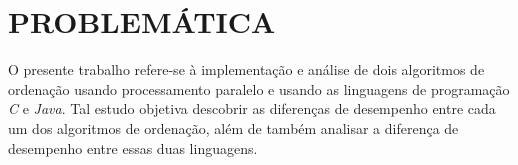 \section{\normalsize PROBLEMÁTICA}
	O presente trabalho refere-se à implementação e análise de dois algoritmos de ordenação usando processamento paralelo e usando as linguagens de programação \textit{C} e \textit{Java}. Tal estudo objetiva  descobrir as diferenças de desempenho entre cada um dos algoritmos de ordenação, além de também analisar a diferença de desempenho entre essas duas linguagens.